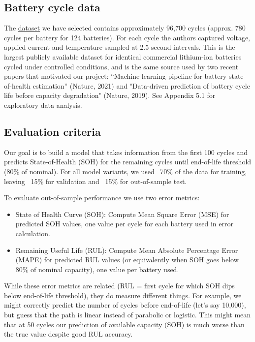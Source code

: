 \documentclass{article}
\begin{document}
\subsection{Battery cycle data}
The \href{https://data.matr.io/1/projects/5c48dd2bc625d700019f3204}{dataset} we have selected contains approximately 96,700 cycles (approx. 780 cycles per battery for 124 batteries). For each cycle the authors captured voltage, applied current and temperature sampled at 2.5 second intervals. This is the largest publicly available dataset for identical commercial lithium-ion batteries cycled under controlled conditions, and is the same source used by two recent papers that motivated our project: “Machine learning pipeline for battery state-of-health estimation” (Nature, 2021)\cite{roman2021machine} and "Data-driven prediction of battery cycle life before capacity degradation" (Nature, 2019)\cite{severson2019data}. See Appendix 5.1 for exploratory data analysis.

\subsection{Evaluation criteria}
Our goal is to build a model that takes information from the first 100 cycles and predicts State-of-Health (SOH) for the remaining cycles until end-of-life threshold (80\% of nominal). For all model variants, we used ~70\% of the data for training, leaving ~15\% for validation and ~15\% for out-of-sample test. 

To evaluate out-of-sample performance we use two error metrics:
\begin{itemize}
    \item State of Health Curve (SOH): Compute Mean Square Error (MSE) for predicted SOH values, one value per cycle for each battery used in error calculation. %
    \item Remaining Useful Life (RUL): Compute Mean Absolute Percentage Error (MAPE) for predicted RUL values (or equivalently when SOH goes below 80\% of nominal capacity), one value per battery used.
    
\end{itemize}

While these error metrics are related (RUL = first cycle for which SOH dips below end-of-life threshold), they do measure different things. For example, we might correctly predict the number of cycles before end-of-life (let's say 10,000), but guess that the path is linear instead of parabolic or logistic. This might mean that at 50 cycles our prediction of available capacity (SOH) is much worse than the true value despite good RUL accuracy. 
\end{document}
